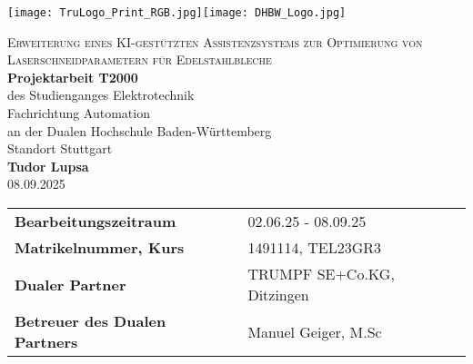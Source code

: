     \begin{titlepage}
        \centering %
       
        \texttt{[image: TruLogo\_Print\_RGB.jpg]}\hfill\texttt{[image: DHBW\_Logo.jpg]}
       
        \vspace{1.5cm} %
       
        {\LARGE\textsc{Erweiterung eines KI-gestützten Assistenzsystems zur Optimierung von
Laserschneidparametern für Edelstahlbleche}}\\[1.5cm]
       
        {\Large\textbf{Projektarbeit T2000}}\\[1cm]
       
        {\large
            des Studienganges Elektrotechnik\\
            Fachrichtung Automation\\
            an der Dualen Hochschule Baden-Württemberg\\
            Standort Stuttgart
        }\\[1.5cm]
       
        {\large\textbf{Tudor Lupsa}}\\[0.5cm]
       
        {\large 08.09.2025}\\[2cm]
       
        \begin{tabular}{ll}
            \textbf{Bearbeitungszeitraum} & 02.06.25 - 08.09.25\\
            \textbf{Matrikelnummer, Kurs} & 1491114, TEL23GR3\\
            \textbf{Dualer Partner} & TRUMPF SE+Co.KG, Ditzingen\\
            \textbf{Betreuer des Dualen Partners} & Manuel Geiger, M.Sc\\
        \end{tabular}
       
    \end{titlepage}